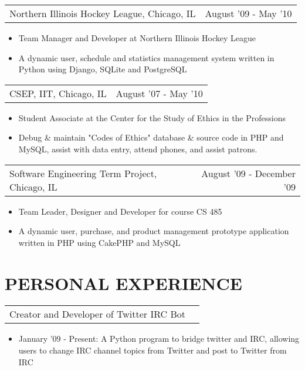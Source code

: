 \documentclass[margin, line]{res}
\begin{document}
\begin{resume}
\begin{tabular}{p{3in} r}
	Northern Illinois Hockey League, Chicago, IL &  August '09  - May '10 
\end{tabular}	
	\begin{itemize} \itemsep -2pt
		\item[] Team Manager and Developer at Northern Illinois Hockey League
		\item[] A dynamic user, schedule and statistics management system written in Python using Django, SQLite and PostgreSQL
	\end{itemize}

\begin{tabular}{p{3in} r} %
	CSEP, IIT, Chicago, IL &  August '07 - May '10
\end{tabular}
	\begin{itemize}  \itemsep -2pt%
		\item[] Student Associate at the Center for the Study of Ethics in the Professions
		\item[] Debug \& maintain "Codes of Ethics" database \& source code in PHP and MySQL, assist with data entry, attend phones, and assist patrons.
	\end{itemize}
	
\begin{tabular}{p{3in} r} %
	Software Engineering Term Project, Chicago, IL &  August '09 - December '09
\end{tabular}
	\begin{itemize}  \itemsep -2pt%
		\item[] Team Leader, Designer and Developer for course CS 485
		\item[] A dynamic user, purchase, and product management prototype application written in PHP using CakePHP and MySQL
	\end{itemize}

\section{PERSONAL EXPERIENCE}

\begin{tabular}{p{3in} r}
	Creator and Developer of Twitter IRC Bot
\end{tabular}	
	\begin{itemize} \itemsep -2pt
		\item[] January '09 - Present: A Python program to bridge twitter and IRC, allowing users to change IRC channel topics from Twitter and post to Twitter from IRC
	\end{itemize}


\end{resume}
\end{document}
